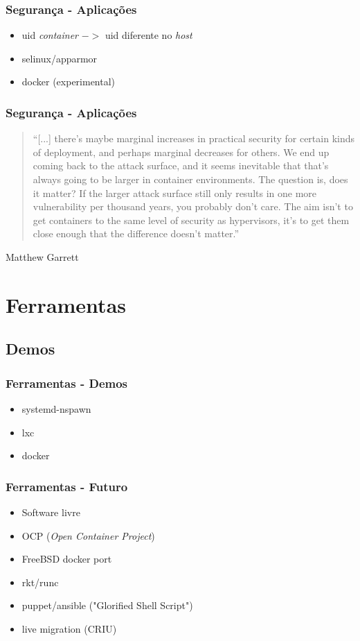 \documentclass{beamer}
\begin{document}
\begin{frame}
    \frametitle{Segurança - Aplicações}
    \begin{itemize}
        \item uid \textit{container} $->$ uid diferente no \textit{host}
        \item selinux/apparmor
        \item docker (experimental)
    \end{itemize}
\end{frame}

\begin{frame}
    \frametitle{Segurança - Aplicações}
    \begin{quote}
        ``[...] there's maybe marginal increases in practical security for
        certain kinds of deployment, and perhaps marginal decreases for others.
        We end up coming back to the attack surface, and it seems inevitable
        that that's always going to be larger in container environments. The
        question is, does it matter? If the larger attack surface still only
        results in one more vulnerability per thousand years, you probably
        don't care. The aim isn't to get containers to the same level of
        security as hypervisors, it's to get them close enough that the
        difference doesn't matter.''
    \end{quote}
    Matthew Garrett
\end{frame}

\section{Ferramentas}

\subsection{Demos}

\begin{frame}
    \frametitle{Ferramentas - Demos}
    \begin{itemize}
        \item systemd-nspawn
        \item lxc
        \item docker
    \end{itemize}
\end{frame}

\begin{frame}
    \frametitle{Ferramentas - Futuro}
    \begin{itemize}
        \item Software livre
        \item OCP (\textit{Open Container Project})
        \item FreeBSD docker port
        \item rkt/runc
        \item puppet/ansible ("Glorified Shell Script")
        \item live migration (CRIU)
    \end{itemize}
\end{frame}
\end{document}
